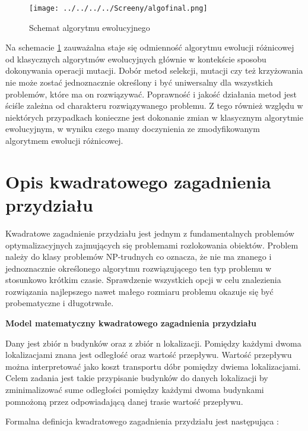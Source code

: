 \begin{figure}[h!]
\begin{center}
		\texttt{[image: ../../../../Screeny/algofinal.png]}
		\caption{Schemat algorytmu ewolucyjnego}
		\label{algo}		
\end{center}	
\end{figure}

Na schemacie \ref{algo} zauważalna staje się odmienność algorytmu ewolucji różnicowej od klasycznych algorytmów ewolucyjnych głównie w kontekście sposobu dokonywania operacji mutacji.
Dobór metod selekcji, mutacji czy też krzyżowania nie może zostać jednoznacznie określony i być uniwersalny dla wszystkich problemów, które ma on rozwiązywać. Poprawność i jakość działania metod jest ściśle zależna od charakteru rozwiązywanego problemu. Z tego również względu w niektórych przypadkach konieczne jest dokonanie zmian w klasycznym algorytmie ewolucyjnym, w wyniku czego mamy doczynienia ze zmodyfikowanym algorytmem ewolucji różnicowej.

\section{Opis kwadratowego zagadnienia przydziału}\label{sec:strukturaDokumentu}

Kwadratowe zagadnienie przydziału jest jednym z fundamentalnych problemów optymalizacyjnych zajmujących się problemami rozlokowania obiektów. Problem należy do klasy problemów NP-trudnych co oznacza, że nie ma znanego i jednoznacznie określonego algorytmu rozwiązującego ten typ problemu w stosunkowo krótkim czasie. Sprawdzenie wszystkich opcji w celu znalezienia rozwiązania najlepszego nawet małego rozmiaru problemu okazuje się być probematyczne i długotrwałe.\\
\par
\textbf{Model matematyczny kwadratowego zagadnienia przydziału}\\
\par
Dany jest zbiór n budynków oraz z zbiór n lokalizacji. Pomiędzy każdymi dwoma lokalizacjami znana jest odległość oraz wartość przepływu. Wartość przepływu można interpretować jako koszt transportu dóbr pomiędzy dwiema lokalizacjami. Celem zadania jest takie przypisanie budynków do danych lokalizacji by zminimalizować sume odległości pomiędzy każdymi dwoma budynkami pomnożoną przez odpowiadającą danej trasie wartość przepływu.

Formalna definicja kwadratowego zagadnienia przydziału jest następująca \cite{chmiel} :

